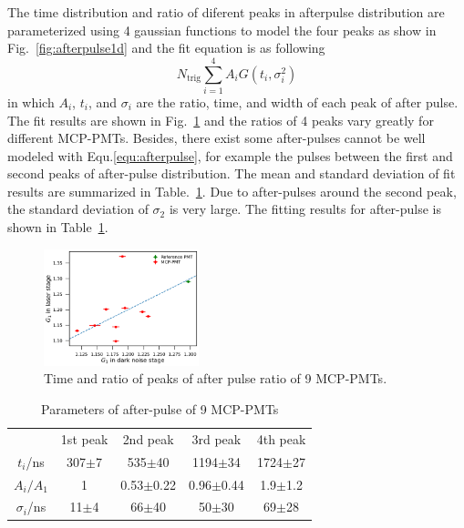 The time distribution and ratio of diferent peaks in afterpulse distribution are parameterized using 4 gaussian functions to model the four peaks as show in Fig.~\ref{fig:afterpulse1d} and the fit equation is as following
\begin{equation}
    \label{equ:afterpulse}
    N_{\mathrm{trig}}\sum_{i=1}^{4}{A_iG(t_i,\sigma_i^2)}
\end{equation}
in which $A_i$, $t_i$, and $\sigma_i$ are the ratio, time, and width of each peak of after pulse. The fit results are shown in Fig.~\ref{fig:afterpulsePeak} and the ratios of 4 peaks vary greatly for different MCP-PMTs. Besides, there exist some after-pulses cannot be well modeled with Equ.\eqref{equ:afterpulse}, for example the pulses between the first and second peaks of after-pulse distribution. The mean and standard deviation of fit results are summarized in Table.~\ref{tab:afterpulse}. Due to after-pulses around the second peak, the standard deviation of $\sigma_2$ is very large. The fitting results for after-pulse is shown in Table~\ref{tab:afterpulse}.
\begin{figure}[!htbp]
    \centering
    \includegraphics[width=0.4\textwidth,page=13]{figures/result/compare.pdf}
    \caption{Time and ratio of peaks of after pulse ratio of 9 MCP-PMTs.}
    \label{fig:afterpulsePeak}
\end{figure}
\begin{table}
    \centering
    \caption{Parameters of after-pulse of 9 MCP-PMTs}
    \label{tab:afterpulse}
    \begin{tabular}{c|c|c|c|c}
        \hline
        &1st peak&2nd peak&3rd peak&4th peak\\
        $t_i$/ns&307$\pm$7&535$\pm$40&1194$\pm$34&1724$\pm$27\\
        $A_i/A_1$&1&0.53$\pm$0.22&0.96$\pm$0.44&1.9$\pm$1.2\\
        $\sigma_i$/ns&11$\pm$4&66$\pm$40&50$\pm$30&69$\pm$28\\
        \hline
    \end{tabular}
\end{table}
